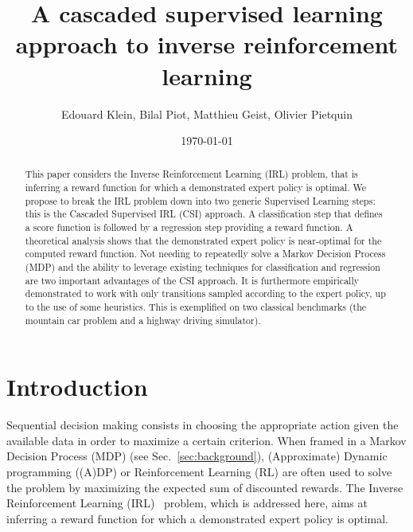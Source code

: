 \documentclass{llncs}
\begin{document}
\title{A cascaded supervised learning approach to inverse reinforcement learning}
\author{Edouard Klein, Bilal Piot, Matthieu Geist, Olivier Pietquin}



\date{\today}


\maketitle

\begin{abstract}
  This paper considers the Inverse Reinforcement Learning (IRL) problem, that is inferring a reward function for which a demonstrated expert policy is optimal.
We propose to break the IRL problem down into two generic Supervised Learning steps: this is the Cascaded Supervised IRL (CSI) approach. A classification step that defines a score function is followed by a regression step providing a reward function.
A theoretical analysis shows that the demonstrated expert policy is near-optimal for the computed reward function.
Not needing to repeatedly solve a Markov Decision Process (MDP) and the ability to leverage existing techniques for classification and regression are two important advantages of the CSI approach. It is furthermore empirically demonstrated to work with only transitions sampled according to the expert policy, up to the use of some heuristics. This is exemplified on two classical benchmarks (the mountain car problem and a highway driving simulator).
  \end{abstract}
\section{Introduction}
\label{sec-2}
Sequential decision making consists in choosing the appropriate action given the available data in order to maximize a certain criterion. When framed in a Markov Decision Process (MDP) (see Sec.~\ref{sec:background}), (Approximate) Dynamic programming ((A)DP) or Reinforcement Learning (RL) are often used to solve the problem by maximizing the expected sum of discounted rewards. The Inverse Reinforcement Learning (IRL)~\cite{russell1998learning} problem, which is addressed here, aims at inferring a reward function for which a demonstrated expert policy is optimal.
\end{document}
